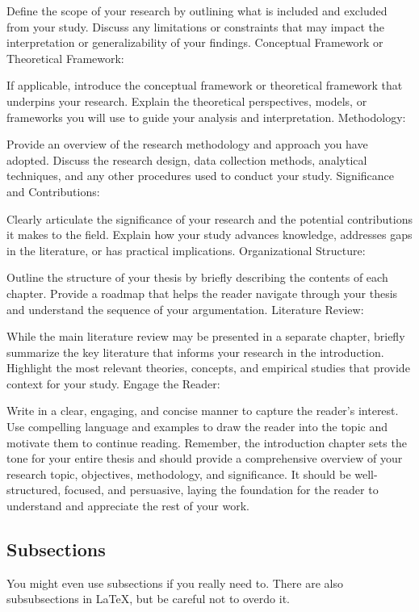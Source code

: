 Define the scope of your research by outlining what is included and excluded from your study. Discuss any limitations or constraints that may impact the interpretation or generalizability of your findings.
Conceptual Framework or Theoretical Framework:

If applicable, introduce the conceptual framework or theoretical framework that underpins your research. Explain the theoretical perspectives, models, or frameworks you will use to guide your analysis and interpretation.
Methodology:

Provide an overview of the research methodology and approach you have adopted. Discuss the research design, data collection methods, analytical techniques, and any other procedures used to conduct your study.
Significance and Contributions:

Clearly articulate the significance of your research and the potential contributions it makes to the field. Explain how your study advances knowledge, addresses gaps in the literature, or has practical implications.
Organizational Structure:

Outline the structure of your thesis by briefly describing the contents of each chapter. Provide a roadmap that helps the reader navigate through your thesis and understand the sequence of your argumentation.
Literature Review:

While the main literature review may be presented in a separate chapter, briefly summarize the key literature that informs your research in the introduction. Highlight the most relevant theories, concepts, and empirical studies that provide context for your study.
Engage the Reader:

Write in a clear, engaging, and concise manner to capture the reader's interest. Use compelling language and examples to draw the reader into the topic and motivate them to continue reading.
Remember, the introduction chapter sets the tone for your entire thesis and should provide a comprehensive overview of your research topic, objectives, methodology, and significance. It should be well-structured, focused, and persuasive, laying the foundation for the reader to understand and appreciate the rest of your work.

\subsection{Subsections}
You might even use subsections if you really need to.
There are also subsubsections in \LaTeX, but be careful not to overdo it.

\lipsum[1-2]